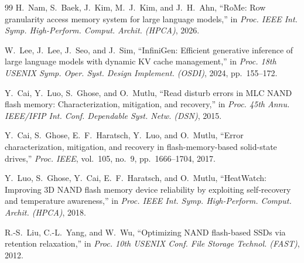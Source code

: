 \documentclass[conference,10pt]{IEEEtran}
\begin{document}
\begin{thebibliography}{99}
H.~Nam, S.~Baek, J.~Kim, M.~J.~Kim, and J.~H.~Ahn, ``{RoMe}: Row granularity
access memory system for large language models,'' in \emph{Proc. IEEE Int.
Symp. High-Perform. Comput. Archit. (HPCA)}, 2026.

W.~Lee, J.~Lee, J.~Seo, and J.~Sim, ``{InfiniGen}: Efficient generative
inference of large language models with dynamic {KV} cache management,'' in
\emph{Proc. 18th USENIX Symp. Oper. Syst. Design Implement. (OSDI)}, 2024,
pp.~155--172.

Y.~Cai, Y.~Luo, S.~Ghose, and O.~Mutlu, ``Read disturb errors in {MLC} {NAND}
flash memory: Characterization, mitigation, and recovery,'' in \emph{Proc.
45th Annu. IEEE/IFIP Int. Conf. Dependable Syst. Netw. (DSN)}, 2015.

Y.~Cai, S.~Ghose, E.~F.~Haratsch, Y.~Luo, and O.~Mutlu, ``Error
characterization, mitigation, and recovery in flash-memory-based solid-state
drives,'' \emph{Proc. IEEE}, vol.~105, no.~9, pp.~1666--1704, 2017.

Y.~Luo, S.~Ghose, Y.~Cai, E.~F.~Haratsch, and O.~Mutlu, ``{HeatWatch}:
Improving {3D} {NAND} flash memory device reliability by exploiting
self-recovery and temperature awareness,'' in \emph{Proc. IEEE Int. Symp.
High-Perform. Comput. Archit. (HPCA)}, 2018.

R.-S.~Liu, C.-L.~Yang, and W.~Wu, ``Optimizing {NAND} flash-based {SSDs} via
retention relaxation,'' in \emph{Proc. 10th USENIX Conf. File Storage Technol.
(FAST)}, 2012.

\end{thebibliography}
\end{document}
